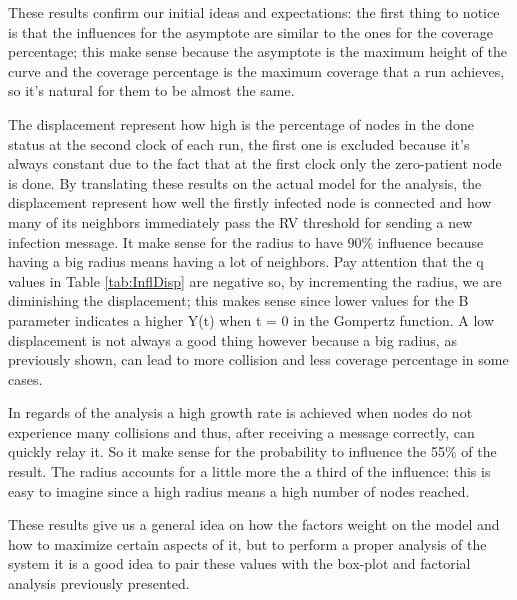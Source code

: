These results confirm our initial ideas and expectations: the first thing to notice is that the influences for the asymptote are similar to the ones for the coverage percentage; this make sense because the asymptote is the maximum height of the curve and the coverage percentage is the maximum coverage that a run achieves, so it's natural for them to be almost the same. 

\medskip
The displacement represent how high is the percentage of nodes in the done status at the second clock of each run, the first one is excluded because it's always constant due to the fact that at the first clock only the zero-patient node is done. By translating these results on the actual model for the analysis, the displacement represent how well the firstly infected node is connected and how many of its neighbors immediately pass the RV threshold for sending a new infection message. It make sense for the radius to have 90\% influence because having a big radius means having a lot of neighbors. Pay attention that the q values in Table \ref{tab:InflDisp} are negative so, by incrementing the radius, we are diminishing the displacement; this makes sense since lower values for the B parameter indicates a higher Y(t) when t = 0 in the Gompertz function. A low displacement is not always a good thing however because a big radius, as previously shown, can lead to more collision and less coverage percentage in some cases. 

\medskip
In regards of the analysis a high growth rate is achieved when nodes do not experience many collisions and thus, after receiving a message correctly, can quickly relay it. So it make sense for the probability to influence the 55\% of the result. The radius accounts for a little more the a third of the influence: this is easy to imagine since a high radius means a high number of nodes reached.

\medskip
These results give us a general idea on how the factors weight on the model and how to maximize certain aspects of it, but to perform a proper analysis of the system it is a good idea to pair these values with the box-plot and factorial analysis previously presented.
\fi